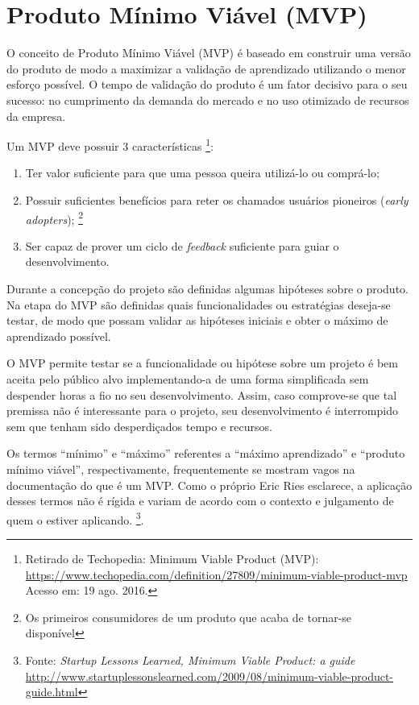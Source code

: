 \section{Produto Mínimo Viável (MVP)}
	\par O conceito de Produto Mínimo Viável (MVP) é baseado em construir uma versão do produto de modo a maximizar a validação de aprendizado utilizando o menor esforço possível. O tempo de validação do produto é um fator decisivo para o seu sucesso: no cumprimento da demanda do mercado e no uso otimizado de recursos da empresa. \citep{ries:11}
    \par Um MVP deve possuir 3 características \footnote{ Retirado de Techopedia: Minimum Viable Product (MVP): \url{https://www.techopedia.com/definition/27809/minimum-viable-product-mvp} Acesso em: 19 ago. 2016.}:
    \begin{enumerate}
        \item Ter valor suficiente para que uma pessoa queira utilizá-lo ou comprá-lo;
        \item Possuir suficientes benefícios para reter os chamados usuários pioneiros (\emph{early adopters}); \footnote{Os primeiros consumidores de um produto que acaba de tornar-se disponível}
        \item Ser capaz de prover um ciclo de \emph{feedback} suficiente para guiar o desenvolvimento.
\end{enumerate}
    \par Durante a concepção do projeto são definidas algumas hipóteses sobre o produto. Na etapa do MVP são definidas quais funcionalidades ou estratégias deseja-se testar, de modo que possam validar as hipóteses iniciais e obter o máximo de aprendizado possível.
    \par O MVP permite testar se a funcionalidade ou hipótese sobre um projeto é bem aceita pelo público alvo implementando-a de uma forma simplificada sem despender horas a fio no seu desenvolvimento. Assim, caso comprove-se que tal premissa não é interessante para o projeto, seu desenvolvimento é interrompido sem que tenham sido desperdiçados tempo e recursos.
    \par Os termos ``mínimo'' e ``máximo'' referentes a ``máximo aprendizado'' e ``produto mínimo viável'', respectivamente, frequentemente se mostram vagos na documentação do que é um MVP. Como o próprio Eric Ries esclarece, a aplicação desses termos não é rígida e variam de acordo com o contexto e julgamento de quem o estiver aplicando. \footnote{Fonte: \emph{Startup Lessons Learned, Minimum Viable Product: a guide} \url{http://www.startuplessonslearned.com/2009/08/minimum-viable-product-guide.html}}.
